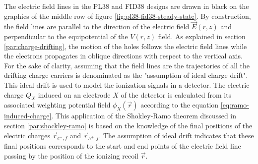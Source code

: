 
The electric field lines in the PL38 and FID38 designs are drawn in black on the graphics of the middle row of figure \ref{fig:pl38-fid38-steady-state}. By construction, the field lines are parallel to the direction of the electric field $\vec{E}(r,z)$ and perpendicular to the equipotential of the $V(r,z)$ field. 
As explained in section \ref{par:charge-drifting}, the motion of the holes follows the electric field lines while the electrons propagates in oblique directions with respect to the vertical axis. For the sake of clarity, assuming that the field lines are the trajectories of all the drifting charge carriers is denominated as the "assumption of ideal charge drift".
This ideal drift is used to model the ionization signals in a detector. The electric charge $Q_X$ induced on an electrode $X$ of the detector is calculated from its associated weighting potential field $\phi_X(\vec{r})$ according to the equation \ref{eq:ramo-induced-charge}. This application of the Shokley-Ramo theorem discussed in section \ref{par:shockley-ramo} is based on the knowledge of the final positions of the electric charges $\vec{r}_{e^-,f}$ and $\vec{r}_{h^+,f}$. The assumption of ideal drift indicates that these final positions corresponds to the start and end points of the electric field line passing by the position of the ionizing recoil $\vec{r}$.

